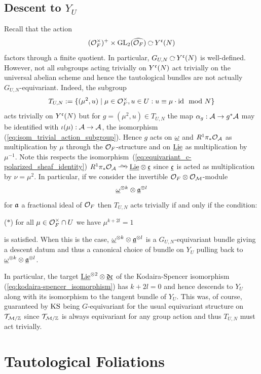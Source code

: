 \documentclass[main.tex]{subfiles}
\begin{document}
\subsection{Descent to $Y_U$} \label{section:descent_to_YU}

Recall that the action 
\[ (\cO_F^\times)^+ \times \GL_2(\widehat{\cO_F}) \acts Y^{\cc}(N) \]
factors through a finite quotient. In particular, $G_{U,N} \acts Y^{\cc}(N)$ is well-defined. However, not all subgroups acting trivially on $Y^{\cc}(N)$ act trivially on the universal abelian scheme and hence the tautological bundles are not actually $G_{U,N}$-equivariant. Indeed, the subgroup 
\[  T_{U,N} := \{ (\mu^2, u) \mid \mu \in \cO_F^\times, u \in U : u \equiv \mu \cdot \id \mod N \} \]
acts trivially on $Y^{\cc}(N)$ but for $g = (\mu^2, u) \in T_{U,N}$ the map $\alpha_g : \cA \to g^* \cA$ may be identified with $\iota(\mu) : \cA \to \cA$, the isomorphism  (\ref{eq:isom_trivial_action_subgroup}). Hence $g$ acts on $\ul{\omega}$ and $R^1 \pi_* \cO_{\cA}$ as multiplication by $\mu$ through the $\cO_F$-structure and on $\ul{\Lie}$ as multiplication by $\mu^{-1}$. Note this respects the isomorphism~(\ref{eq:equivariant_c-polarized_sheaf_identity}) $R^1 \pi_* \cO_{\cA} \iso \ul{\Lie} \ot \ul{\cc}$ since $\ul{\cc}$ is acted as multiplication by $\nu = \mu^2$. In particular, if we consider the invertible $\cO_F \ot \cO_{\cM}$-module 
\[ \ul{\omega}^{\ot k} \ot \ul{\aa}^{\ot l} \]
for $\aa$ a fractional ideal of $\cO_F$ then $T_{U,N}$ acts trivially if and only if the condition:
\begin{center} \label{condition_descent_star}
($\ast$) \quad for all $\mu \in \cO_F^\times \cap U$ we have $\mu^{k + 2 l} = 1$
\end{center}
is satisfied. When this is the case, $\ul{\omega}^{\ot k} \ot \ul{\aa}^{\ot l}$ is a $G_{U,N}$-equivariant bundle giving a descent datum and thus a canonical choice of bundle on $Y_U$ pulling back to $\ul{\omega}^{\ot k} \ot \ul{\aa}^{\ot l}$. 

In particular, the target $\ul{\Lie}^{\ot 2} \ot \ul{\dd \cc}$ of the Kodaira-Spencer isomorphism (\ref{eq:kodaira-spencer_isomorphism}) has $k + 2l = 0$ and hence descends to $Y_U$ along with its isomorphism to the tangent bundle of $Y_U$. This was, of course, guaranteed by $\KS$ being $G$-equivariant for the usual equivariant structure on $\T_{\cM / \ZZ}$ since $\T_{\cM / \ZZ}$ is always equivariant for any group action and thus $T_{U,N}$ must act trivially.

\section{Tautological Foliations} \label{sec:tautological_foliations}
\end{document}
